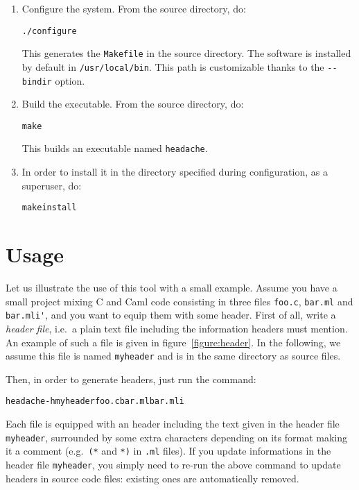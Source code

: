 \documentclass{article}
\newcommand{\headache}{\texttt{headache}}
\begin{document}
\begin{enumerate}
\item Configure the system.  From the source directory, do:
\begin{alltt}
  ./configure
\end{alltt}
This generates the \verb+Makefile+ in the source directory.  The
software is installed by default in \verb+/usr/local/bin+.  This path
is customizable thanks to the \verb+--bindir+ option.

\item Build the executable.  From the source directory, do:
\begin{alltt}
  make
\end{alltt}  
  This builds an executable named \headache{}.  
  
\item In order to install it in the directory specified during
  configuration, as a superuser, do:
\begin{alltt}
  make install
\end{alltt}
\end{enumerate}


\section{Usage}

Let us illustrate the use of this tool with a small example.  Assume
you have a small project mixing C and Caml code consisting in three
files \verb+foo.c+, \verb+bar.ml+ and \verb+bar.mli'+, and you want to
equip them with some header.  First of all, write a \emph{header
  file}, i.e.\ a plain text file including the information headers
must mention.  An example of such a file is given in
figure~\ref{figure:header}.  In the following, we assume this file is
named \verb+myheader+ and is in the same directory as source files.

Then, in order to generate headers, just run the command:
\begin{alltt}
  headache -h myheader foo.c bar.ml bar.mli
\end{alltt}
Each file is equipped with an header including the text given in the
header file \verb+myheader+, surrounded by some extra characters
depending on its format making it a comment (e.g.\ \verb+(*+ and
\verb+*)+ in \verb+.ml+ files).  If you update informations in the
header file \verb+myheader+, you simply need to re-run the above
command to update headers in source code files: existing ones are
automatically removed.
\end{document}
